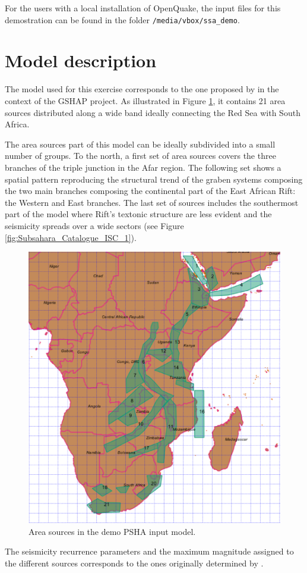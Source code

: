 For the users with a local installation of OpenQuake, the input files 
for this demostration can be found in the folder 
\texttt{/media/vbox/ssa\_demo}.
%
\section{Model description}
%
The model used for this exercise corresponds to the one proposed by 
\citet{midzi1999} in the context of the GSHAP project.
As illustrated in Figure \ref{fig:ssa_area_sources}, it contains 21 
area sources distributed along a wide band ideally connecting the 
Red Sea with South Africa.

The area sources part of this model can be ideally subdivided into a small 
number of groups.
%
To the north, a first set of area sources covers the three branches 
of the triple junction in the Afar region. 
The following set shows a spatial pattern reproducing the structural 
trend of the graben systems composing the two main branches composing 
the continental part of the East African Rift: the Western and East 
branches. 
The last set of sources includes the southermost part of the model 
where Rift's textonic structure are less evident and the seismicity 
spreads over a wide sectors (see Figure \ref{fig:Subsahara_Catalogue_ISC_1}).
%
\begin{figure}[!ht]
	\centering
	\includegraphics[width=14cm]
        {./figures/ssa_area_sources.eps}
	\caption{Area sources in the demo PSHA input model.}
	\label{fig:ssa_area_sources}
\end{figure}
%
The seismicity recurrence parameters and the maximum magnitude 
assigned to the different sources corresponds to the ones originally
determined by \citet{midzi1999}.


